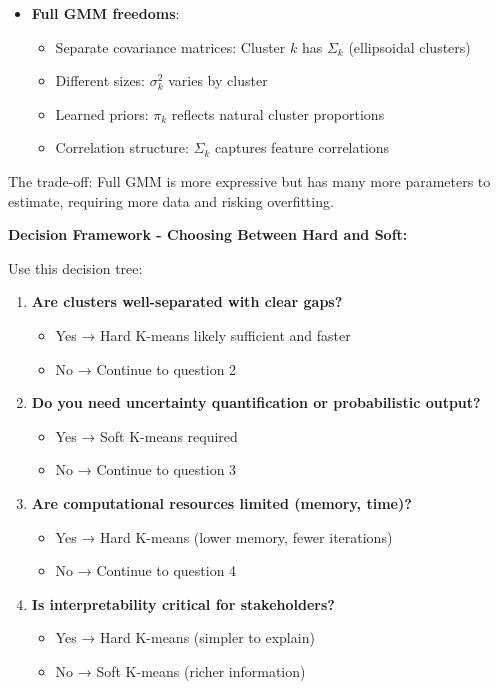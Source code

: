 \documentclass[12pt]{article}
\begin{document}
\begin{explanation}
\begin{itemize}
    \item \textbf{Full GMM freedoms}:
    \begin{itemize}
        \item Separate covariance matrices: Cluster $k$ has $\Sigma_k$ (ellipsoidal clusters)
        \item Different sizes: $\sigma_k^2$ varies by cluster
        \item Learned priors: $\pi_k$ reflects natural cluster proportions
        \item Correlation structure: $\Sigma_k$ captures feature correlations
    \end{itemize}
\end{itemize}

The trade-off: Full GMM is more expressive but has many more parameters to estimate, requiring more data and risking overfitting.

\textbf{Decision Framework - Choosing Between Hard and Soft:}

Use this decision tree:

\begin{enumerate}
    \item \textbf{Are clusters well-separated with clear gaps?}
    \begin{itemize}
        \item Yes → Hard K-means likely sufficient and faster
        \item No → Continue to question 2
    \end{itemize}

    \item \textbf{Do you need uncertainty quantification or probabilistic output?}
    \begin{itemize}
        \item Yes → Soft K-means required
        \item No → Continue to question 3
    \end{itemize}

    \item \textbf{Are computational resources limited (memory, time)?}
    \begin{itemize}
        \item Yes → Hard K-means (lower memory, fewer iterations)
        \item No → Continue to question 4
    \end{itemize}

    \item \textbf{Is interpretability critical for stakeholders?}
    \begin{itemize}
        \item Yes → Hard K-means (simpler to explain)
        \item No → Soft K-means (richer information)
    \end{itemize}


\end{enumerate}
\end{explanation}
\end{document}
